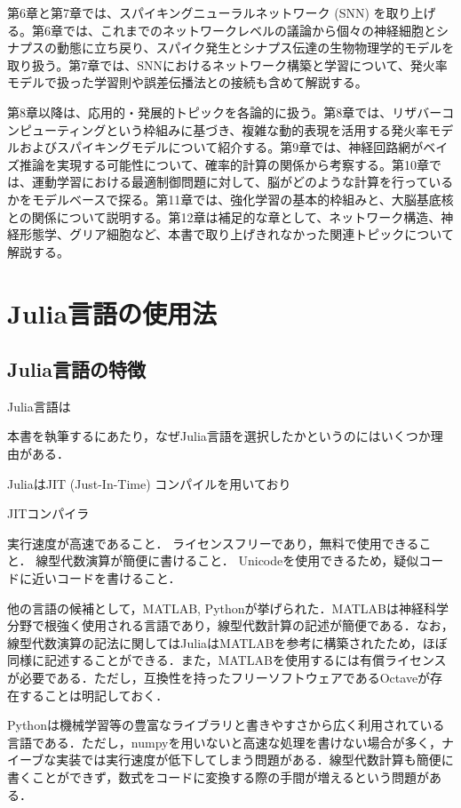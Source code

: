 \documentclass[titlepage]{ltjsbook}
\begin{document}
第6章と第7章では、スパイキングニューラルネットワーク (SNN) を取り上げる。第6章では、これまでのネットワークレベルの議論から個々の神経細胞とシナプスの動態に立ち戻り、スパイク発生とシナプス伝達の生物物理学的モデルを取り扱う。第7章では、SNNにおけるネットワーク構築と学習について、発火率モデルで扱った学習則や誤差伝播法との接続も含めて解説する。

第8章以降は、応用的・発展的トピックを各論的に扱う。第8章では、リザバーコンピューティングという枠組みに基づき、複雑な動的表現を活用する発火率モデルおよびスパイキングモデルについて紹介する。第9章では、神経回路網がベイズ推論を実現する可能性について、確率的計算の関係から考察する。第10章では、運動学習における最適制御問題に対して、脳がどのような計算を行っているかをモデルベースで探る。第11章では、強化学習の基本的枠組みと、大脳基底核との関係について説明する。第12章は補足的な章として、ネットワーク構造、神経形態学、グリア細胞など、本書で取り上げきれなかった関連トピックについて解説する。

\section{Julia言語の使用法}
\subsection{Julia言語の特徴}
Julia言語は

本書を執筆するにあたり，なぜJulia言語を選択したかというのにはいくつか理由がある．

JuliaはJIT (Just-In-Time) コンパイルを用いており

JITコンパイラ

実行速度が高速であること．
ライセンスフリーであり，無料で使用できること．
線型代数演算が簡便に書けること．
Unicodeを使用できるため，疑似コードに近いコードを書けること．

他の言語の候補として，MATLAB, Pythonが挙げられた．MATLABは神経科学分野で根強く使用される言語であり，線型代数計算の記述が簡便である．なお，線型代数演算の記法に関してはJuliaはMATLABを参考に構築されたため，ほぼ同様に記述することができる．また，MATLABを使用するには有償ライセンスが必要である．ただし，互換性を持ったフリーソフトウェアであるOctaveが存在することは明記しておく．

Pythonは機械学習等の豊富なライブラリと書きやすさから広く利用されている言語である．ただし，numpyを用いないと高速な処理を書けない場合が多く，ナイーブな実装では実行速度が低下してしまう問題がある．線型代数計算も簡便に書くことができず，数式をコードに変換する際の手間が増えるという問題がある．
\end{document}
